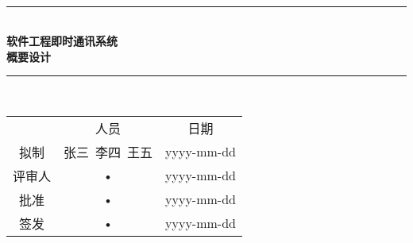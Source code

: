 \documentclass[bachelor]{ustcthesis}
\newcommand{\HRule}{\rule{\linewidth}{0.5mm}}
\begin{document}
\begin{titlepage}
\begin{center}
~\\[5cm]
\HRule \\[0.4cm]
{\huge \bfseries 软件工程即时通讯系统\\概要设计}\\[0.4cm]
\HRule \\[1.5cm]

\begin{tabular}{ccc}
  & 人员 & 日期 \\ 
拟制 & 张三\ 李四\ 王五 & yyyy-mm-dd \\ 
评审人 & • & yyyy-mm-dd \\ 
批准 & • & yyyy-mm-dd \\ 
签发 & • & yyyy-mm-dd \\ 
\end{tabular} 

\end{center}
\end{titlepage}



\frontmatter

\tableofcontents
\listoffigures
\listoftables
% 

\mainmatter

















\end{document}
